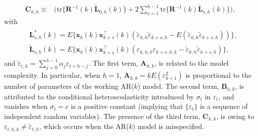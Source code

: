 \documentclass[ejsv2]{imsart}
\theoremstyle{plain}
\theoremstyle{definition}
\theoremstyle{remark}
\begin{document}
\begin{equation*}
\begin{split}
     \bm{C}_{h, k}\equiv&\Big(\mathrm{tr}\{\mathbf{R}^{-1}(k)\tilde{\mathbf{L}}_{0,h}(k)\}+2\sum_{s=1}^{h-1}\mathrm{tr}\{\mathbf{R}^{-1}(k)\tilde{\mathbf{L}}_{s,h}(k)\}\Big),
\end{split}
\end{equation*}
with
\begin{align*}
\begin{split}
&\mathbf{L}^\ast_{s,h}(k)=E\{\mathbf{x}_k(k)\mathbf{x}_{k+s}^\top(k)(\tilde{\varepsilon}_{k,h}
\tilde{\varepsilon}_{k+s,h}-E(\tilde{\varepsilon}_{k,h}\tilde{\varepsilon}_{k+s,h}))\},\\
& \tilde{\mathbf{L}}_{s,h}(k)=
E\{\mathbf{x}_k(k)\mathbf{x}_{k+s}^\top(k)(\varepsilon_{k,h,k}\varepsilon_{k+s,h,k}-\tilde{\varepsilon}_{k,h}\tilde{\varepsilon}_{k+s,h})\},
\end{split}
\end{align*}
and
$\tilde{\varepsilon}_{t,h}=\sum_{j=0}^{h-1}\alpha_j\varepsilon_{t+h-j}$. The first term, $\bm{A}_{h, k}$, is related to the model complexity.
In particular, when $h=1$, $\bm{A}_{h, k}=k E(\varepsilon_{k+1}^2)$
is proportional to the number of parameters of the working AR($k$) model.
The second term,
$\bm{B}_{h, k}$,
is attributed to the conditional heteroscedasticity introduced by $\sigma_t$ in $\varepsilon_t$,
and vanishes when $\sigma_t=c$ is a positive constant (implying that $\{\varepsilon_t\}$ is a sequence of independent random variables).
The presence of the third term, $\bm{C}_{h, k}$, is owing to
$\varepsilon_{t,h,k} \neq \tilde{\varepsilon}_{t, h}$,
which occurs when the AR($k$) model is misspecified.
\end{document}
